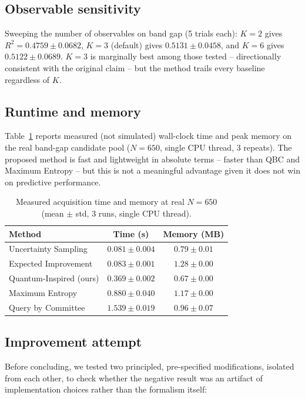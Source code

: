 \documentclass[conference]{IEEEtran}
\begin{document}
\subsection{Observable sensitivity}\label{sec:obssens}

Sweeping the number of observables on band gap (5 trials each): $K=2$ gives $R^2=0.4759\pm0.0682$, $K=3$ (default) gives $0.5131\pm0.0458$, and $K=6$ gives $0.5122\pm0.0689$. $K=3$ is marginally best among those tested -- directionally consistent with the original claim -- but the method trails every baseline regardless of $K$.

\subsection{Runtime and memory}\label{sec:runtime}

Table~\ref{tab:runtime} reports measured (not simulated) wall-clock time and peak memory on the real band-gap candidate pool ($N=650$, single CPU thread, 3 repeats). The proposed method is fast and lightweight in absolute terms -- faster than QBC and Maximum Entropy -- but this is not a meaningful advantage given it does not win on predictive performance.

\begin{table}[!t]
\centering
\caption{Measured acquisition time and memory at real $N=650$ (mean $\pm$ std, 3 runs, single CPU thread).}
\label{tab:runtime}
\begin{tabular}{lcc}
\toprule
Method & Time (s) & Memory (MB) \\
\midrule
Uncertainty Sampling & $0.081\pm0.004$ & $0.79\pm0.01$ \\
Expected Improvement & $0.083\pm0.001$ & $1.28\pm0.00$ \\
Quantum-Inspired (ours) & $0.369\pm0.002$ & $0.67\pm0.00$ \\
Maximum Entropy & $0.880\pm0.040$ & $1.17\pm0.00$ \\
Query by Committee & $1.539\pm0.019$ & $0.96\pm0.07$ \\
\bottomrule
\end{tabular}
\end{table}

\subsection{Improvement attempt}\label{sec:improvement}

Before concluding, we tested two principled, pre-specified modifications, isolated from each other, to check whether the negative result was an artifact of implementation choices rather than the formalism itself:
\end{document}
